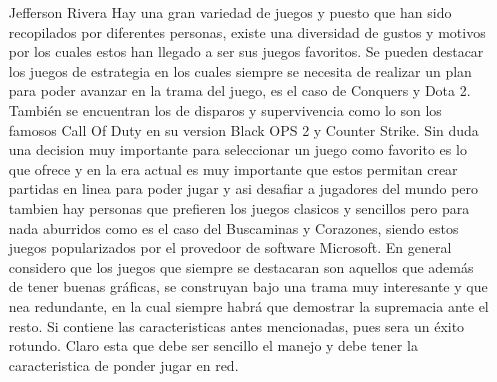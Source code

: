 \documentclass[12pt,oneside]{book}
\begin{document}
\begin{itemize}
\item[Jefferson Rivera] Hay una gran variedad de juegos y puesto que han sido recopilados por diferentes personas, existe una diversidad de gustos y motivos por los cuales estos han llegado a ser sus juegos favoritos. Se pueden destacar los juegos de estrategia en los cuales siempre se necesita de realizar un plan para poder avanzar en la trama del juego, es el caso de Conquers y Dota 2. También se encuentran los de disparos y supervivencia como lo son los famosos Call Of Duty en su version Black OPS 2 y Counter Strike. Sin duda una decision muy importante para seleccionar un juego como favorito es lo que ofrece y en la era actual es muy importante que estos permitan crear partidas en linea para poder jugar y asi desafiar a jugadores del mundo pero tambien hay personas que prefieren los juegos clasicos y sencillos pero para nada aburridos como es el caso del Buscaminas y Corazones, siendo estos juegos popularizados por el provedoor de software Microsoft.
En general considero que los juegos que siempre se destacaran son aquellos que además de tener buenas gráficas, se construyan bajo una trama muy interesante y que nea redundante, en la cual siempre habrá que demostrar la supremacia ante el resto. Si contiene las caracteristicas antes mencionadas, pues sera un éxito rotundo. Claro esta que debe ser sencillo el manejo y debe tener la caracteristica de ponder jugar en red.
\end{itemize}
\end{document}

